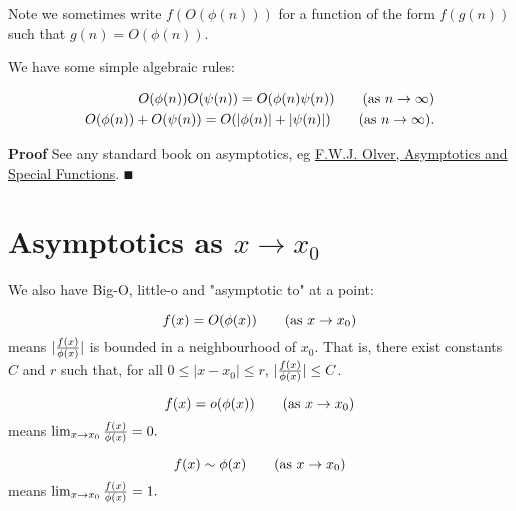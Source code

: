 Note we sometimes write $f(O(\ensuremath{\phi}(n)))$ for a function of the form $f(g(n))$ such that $g(n) = O(\ensuremath{\phi}(n))$.

We have some simple algebraic rules:

\begin{proposition}
\begin{align*}
O(\ensuremath{\phi}(n))O(\ensuremath{\psi}(n)) = O(\ensuremath{\phi}(n)\ensuremath{\psi}(n))  \qquad \hbox{(as $n \ensuremath{\rightarrow} \ensuremath{\infty}$)} \\
O(\ensuremath{\phi}(n)) + O(\ensuremath{\psi}(n)) = O(|\ensuremath{\phi}(n)| + |\ensuremath{\psi}(n)|)  \qquad \hbox{(as $n \ensuremath{\rightarrow} \ensuremath{\infty}$)}.
\end{align*}
\end{proposition}
\textbf{Proof} See any standard book on asymptotics, eg \href{https://www.taylorfrancis.com/books/mono/10.1201/9781439864548/asymptotics-special-functions-frank-olver}{F.W.J. Olver, Asymptotics and Special Functions}. \ensuremath{\QED}

\section{Asymptotics as $x \ensuremath{\rightarrow} x_0$}
We also have Big-O, little-o and "asymptotic to" at a point:

\begin{definition}[Big-O] 
\[
f(x) = O(\ensuremath{\phi}(x)) \qquad \hbox{(as $x \ensuremath{\rightarrow} x_0$)}
\]
means $|{f(x) \over \ensuremath{\phi}(x)}|$ is bounded in a neighbourhood of $x_0$. That is, there exist constants $C$ and $r$ such  that, for all $0 \leq |x - x_0| \leq r$, $|{f(x) \over \ensuremath{\phi}(x)}| \leq C$. \end{definition}

\begin{definition}[little-O] 
\[
f(x) = o(\ensuremath{\phi}(x)) \qquad \hbox{(as $x \ensuremath{\rightarrow} x_0$)}
\]
means $\lim_{x \ensuremath{\rightarrow} x_0} {f(x) \over \ensuremath{\phi}(x)} = 0.$ \end{definition}

\begin{definition}[asymptotic to] 
\[
f(x) \ensuremath{\sim} \ensuremath{\phi}(x) \qquad \hbox{(as $x \ensuremath{\rightarrow} x_0$)}
\]
means $\lim_{x \ensuremath{\rightarrow} x_0} {f(x) \over \ensuremath{\phi}(x)} = 1.$ \end{definition}

